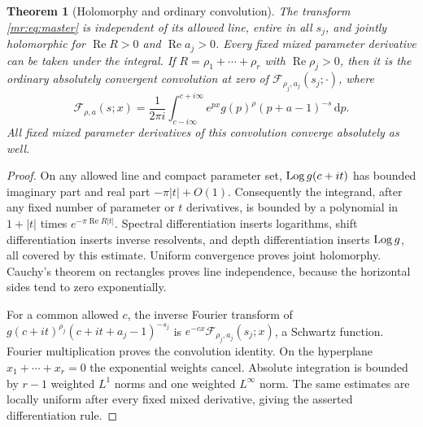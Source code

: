 \documentclass[11pt,letterpaper]{article}
\newtheorem{theorem}{Theorem}[section]
\theoremstyle{definition}\newtheorem{definition}[theorem]{Definition}
\theoremstyle{remark}\newtheorem{remark}[theorem]{Remark}
\newcommand{\Rea}{\operatorname{Re}}\newcommand{\Ima}{\operatorname{Im}}
\newcommand{\dd}{\,\mathrm d}\newcommand{\M}{\mathcal M}
\newcommand{\F}{\mathcal F}\newcommand{\B}{\mathcal B}
\begin{document}
\begin{theorem}[Holomorphy and ordinary convolution]\label{mr:thm:master}
The transform \eqref{mr:eq:master} is independent of its allowed line,
entire in all $s_j$, and jointly holomorphic for $\Rea R>0$ and
$\Rea a_j>0$. Every fixed mixed parameter derivative can be taken
under the integral. If $R=\rho_1+\cdots+\rho_r$ with $\Rea\rho_j>0$,
then it is the ordinary absolutely convergent convolution at zero of
$\F_{\rho_j,a_j}(s_j;\cdot)$, where
\begin{equation}\label{mr:eq:F}
 \F_{\rho,a}(s;x)=\frac1{2\pi i}\int_{c-i\infty}^{c+i\infty}
 e^{px}g(p)^\rho(p+a-1)^{-s}\dd p.
\end{equation}
All fixed mixed parameter derivatives of this convolution converge
absolutely as well.
\end{theorem}
\begin{proof}
On any allowed line and compact parameter set, $\operatorname{Log} g(c+it)$ has
bounded imaginary part and real part $-\pi|t|+O(1)$.
Consequently the integrand, after any fixed number of parameter or
$t$ derivatives, is bounded by a polynomial in $1+|t|$ times
$e^{-\pi\Rea R|t|}$. Spectral differentiation inserts logarithms,
shift differentiation inserts inverse resolvents, and depth differentiation
inserts $\operatorname{Log} g$, all covered by this estimate. Uniform convergence
proves joint holomorphy. Cauchy's theorem on rectangles proves line
independence, because the horizontal sides tend to zero exponentially.

For a common allowed $c$, the inverse Fourier transform of
$g(c+it)^{\rho_j}(c+it+a_j-1)^{-s_j}$ is
$e^{-cx}\F_{\rho_j,a_j}(s_j;x)$, a Schwartz function. Fourier
multiplication proves the convolution identity. On the hyperplane
$x_1+\cdots+x_r=0$ the exponential weights cancel. Absolute integration
is bounded by $r-1$ weighted $L^1$ norms and one weighted $L^\infty$
norm. The same estimates are locally uniform after every fixed mixed
derivative, giving the asserted differentiation rule.
\end{proof}
\end{document}
